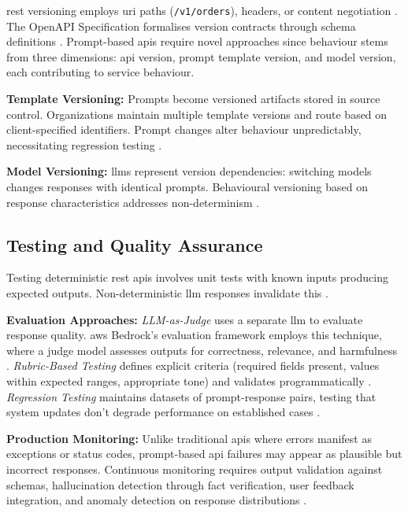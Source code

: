 \gls{rest} versioning employs \gls{uri} paths (\texttt{/v1/orders}), headers, or content negotiation \cite{fielding_architectural_2000, richardson_restful_2007}. The OpenAPI Specification formalises version contracts through schema definitions \cite{andrews_openai_2025}. Prompt-based \gls{api}s require novel approaches since behaviour stems from three dimensions: \gls{api} version, prompt template version, and model version, each contributing to service behaviour.

\textbf{Template Versioning:} Prompts become versioned artifacts stored in source control. Organizations maintain multiple template versions and route based on client-specified identifiers. Prompt changes alter behaviour unpredictably, necessitating regression testing \cite{lercher_managing_2024, martinlopez_online_2022}.

\textbf{Model Versioning:} \gls{llm}s represent version dependencies: switching models changes responses with identical prompts. Behavioural versioning based on response characteristics addresses non-determinism \cite{lercher_managing_2024}.

\subsection{Testing and Quality Assurance}

Testing deterministic \gls{rest} \gls{api}s involves unit tests with known inputs producing expected outputs. Non-deterministic \gls{llm} responses invalidate this \cite{martinlopez_online_2022}.

\textbf{Evaluation Approaches:} \textit{LLM-as-Judge} uses a separate \gls{llm} to evaluate response quality. \gls{aws} Bedrock's evaluation framework employs this technique, where a judge model assesses outputs for correctness, relevance, and harmfulness \cite{aws_bedrock_2025}. \textit{Rubric-Based Testing} defines explicit criteria (required fields present, values within expected ranges, appropriate tone) and validates programmatically \cite{sahoo_systematic_2025}. \textit{Regression Testing} maintains datasets of prompt-response pairs, testing that system updates don't degrade performance on established cases \cite{martinlopez_online_2022}.

\textbf{Production Monitoring:} Unlike traditional \gls{api}s where errors manifest as exceptions or status codes, prompt-based \gls{api} failures may appear as plausible but incorrect responses. Continuous monitoring requires output validation against schemas, hallucination detection through fact verification, user feedback integration, and anomaly detection on response distributions \cite{lercher_managing_2024, zhou_hademif_2025}.

